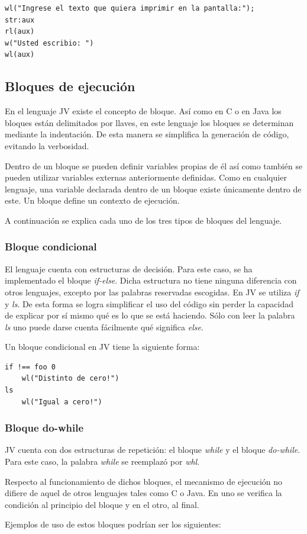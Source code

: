 \documentclass[spanish]{article}
\begin{document}
            \begin{lstlisting}
wl("Ingrese el texto que quiera imprimir en la pantalla:");
str:aux
rl(aux)
w("Usted escribio: ")
wl(aux)
            \end{lstlisting}

        \subsection{Bloques de ejecución}
            \par En el lenguaje JV existe el concepto de bloque. Así como en C o en Java los bloques están delimitados por llaves, en este lenguaje los bloques se determinan mediante la indentación. De esta manera se simplifica la generación de código, evitando la verbosidad.
            \par Dentro de un bloque se pueden definir variables propias de él así como también se pueden utilizar variables externas anteriormente definidas. Como en cualquier lenguaje, una variable declarada dentro de un bloque existe únicamente dentro de este. Un bloque define un contexto de ejecución.
            \par A continuación se explica cada uno de los tres tipos de bloques del lenguaje.

            \subsubsection{Bloque condicional}
                \par El lenguaje cuenta con estructuras de decisión. Para este caso, se ha implementado el bloque \textit{if-else}. Dicha estructura no tiene ninguna diferencia con otros lenguajes, excepto por las palabras reservadas escogidas. En JV se utiliza \textit{if} y \textit{ls}. De esta forma se logra simplificar el uso del código sin perder la capacidad de explicar por sí mismo qué es lo que se está haciendo. Sólo con leer la palabra \textit{ls} uno puede darse cuenta fácilmente qué significa \textit{else}.
                \par Un bloque condicional en JV tiene la siguiente forma:
                \begin{lstlisting}
if !== foo 0
    wl("Distinto de cero!")
ls
    wl("Igual a cero!")
                \end{lstlisting}      

            \subsubsection{Bloque do-while}
                \par JV cuenta con dos estructuras de repetición: el bloque \textit{while} y el bloque \textit{do-while}. Para este caso, la palabra \textit{while} se reemplazó por \textit{whl}.
                \par Respecto al funcionamiento de dichos bloques, el mecanismo de ejecución no difiere de aquel de otros lenguajes tales como C o Java. En uno se verifica la condición al principio del bloque y en el otro, al final.
                \par Ejemplos de uso de estos bloques podrían ser los siguientes:
\end{document}
